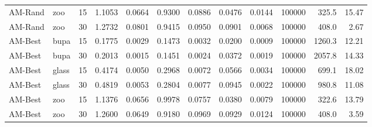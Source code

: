 \begin{longtable}{llcrrrrrrrrr}
    AM-Rand & zoo & 15 & 1.1053 & 0.0664 & 0.9300 & 0.0886 & 0.0476 & 0.0144 & 100000 & 325.5 & 15.47 \\
    AM-Rand & zoo & 30 & 1.2732 & 0.0801 & 0.9415 & 0.0950 & 0.0901 & 0.0068 & 100000 & 408.0 & 2.67 \\
    \midrule
    AM-Best & bupa & 15 & 0.1775 & 0.0029 & 0.1473 & 0.0032 & 0.0200 & 0.0009 & 100000 & 1260.3 & 12.21 \\
    AM-Best & bupa & 30 & 0.2013 & 0.0015 & 0.1451 & 0.0024 & 0.0372 & 0.0019 & 100000 & 2057.8 & 14.33 \\
    AM-Best & glass & 15 & 0.4174 & 0.0050 & 0.2968 & 0.0072 & 0.0566 & 0.0034 & 100000 & 699.1 & 18.02 \\
    AM-Best & glass & 30 & 0.4819 & 0.0053 & 0.2804 & 0.0077 & 0.0945 & 0.0022 & 100000 & 980.8 & 11.08 \\
    AM-Best & zoo & 15 & 1.1376 & 0.0656 & 0.9978 & 0.0757 & 0.0380 & 0.0079 & 100000 & 322.6 & 13.79 \\
    AM-Best & zoo & 30 & 1.2600 & 0.0649 & 0.9180 & 0.0969 & 0.0929 & 0.0124 & 100000 & 408.0 & 3.59 \\
\end{longtable}
\endgroup